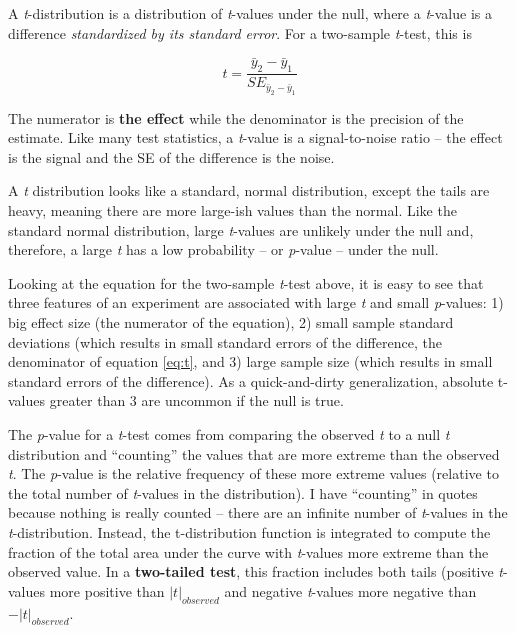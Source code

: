 \documentclass[]{book}
\begin{document}
A \emph{t}-distribution is a distribution of \emph{t}-values under the null, where a \emph{t}-value is a difference \emph{standardized by its standard error}. For a two-sample \emph{t}-test, this is

\begin{equation}
t = \frac{\bar{y}_2 - \bar{y}_1}{SE_{\bar{y}_2 - \bar{y}_1}}
\label{eq:t}
\end{equation}

The numerator is \textbf{the effect} while the denominator is the precision of the estimate. Like many test statistics, a \emph{t}-value is a signal-to-noise ratio -- the effect is the signal and the SE of the difference is the noise.

A \emph{t} distribution looks like a standard, normal distribution, except the tails are heavy, meaning there are more large-ish values than the normal. Like the standard normal distribution, large \emph{t}-values are unlikely under the null and, therefore, a large \emph{t} has a low probability -- or \emph{p}-value -- under the null.

Looking at the equation for the two-sample \emph{t}-test above, it is easy to see that three features of an experiment are associated with large \emph{t} and small \emph{p}-values: 1) big effect size (the numerator of the equation), 2) small sample standard deviations (which results in small standard errors of the difference, the denominator of equation \eqref{eq:t}, and 3) large sample size (which results in small standard errors of the difference). As a quick-and-dirty generalization, absolute t-values greater than 3 are uncommon if the null is true.

The \emph{p}-value for a \emph{t}-test comes from comparing the observed \emph{t} to a null \emph{t} distribution and ``counting'' the values that are more extreme than the observed \emph{t}. The \emph{p}-value is the relative frequency of these more extreme values (relative to the total number of \emph{t}-values in the distribution). I have ``counting'' in quotes because nothing is really counted -- there are an infinite number of \emph{t}-values in the \emph{t}-distribution. Instead, the t-distribution function is integrated to compute the fraction of the total area under the curve with \emph{t}-values more extreme than the observed value. In a \textbf{two-tailed test}, this fraction includes both tails (positive \emph{t}-values more positive than \(|t|_{observed}\) and negative \emph{t}-values more negative than \(-|t|_{observed}\).
\end{document}
